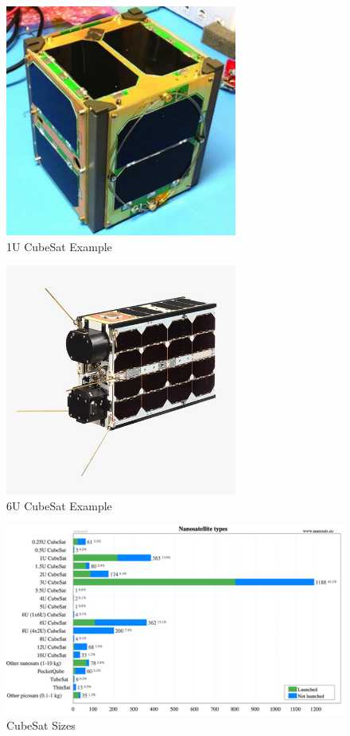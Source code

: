 \begin{figure}
    \centering
    \includegraphics[width=3in]{Thesis/Literature_Review/Lit Review Figures/vanderbiltcubesat.jpg}
    \caption{1U CubeSat Example}
    \label{fig:1U CubeSat Example}
\end{figure}

\begin{figure}
    \centering
    \includegraphics[width=3in]{Thesis/Literature_Review/Lit Review Figures/6Ucubesatbus.jpg}
    \caption{6U CubeSat Example}
    \label{fig:6U CubeSat Example}
\end{figure}

\begin{figure}
    \centering
    \includegraphics[width=\textwidth]{Thesis/Literature_Review/Lit Review Figures/CubeSat Sizes.png}
    \caption{CubeSat Sizes}
    \label{fig:CubeSat Sizes}
\end{figure}

